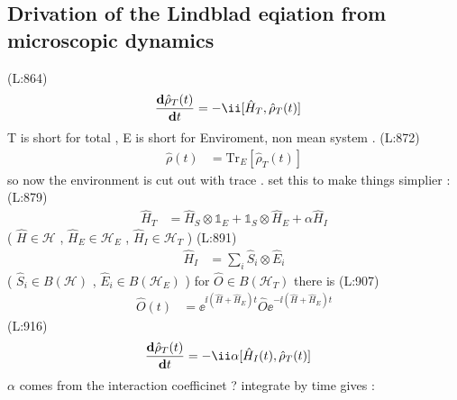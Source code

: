  \subsection{ Drivation of the Lindblad eqiation from microscopic dynamics}
(L:864)
\begin{equation}
\begin{split}
\dfrac{\bold{d}\hat{\rho }_{T }(t )}{\bold{d}t }&=-\ii [\hat{H }_{T },\hat{\rho }_{T }(t )]\end{split}
\end{equation}
 T is short for total , E is short for Enviroment, non mean system .
(L:872)
\begin{equation}
\begin{split}
\hat{\rho }(t )&=\text{Tr}_{E }[\hat{\rho }_{T }(t )]\end{split}
\end{equation}
 so now the environment is cut out with trace . 
 set this to make things simplier : 
(L:879)
\begin{equation}
\begin{split}
\hat{H }_{T }&=\hat{H }_{S }\otimes \mathds{1}_{E }+\mathds{1}_{S }\otimes \hat{H }_{E }+\alpha \hat{H }_{I }\end{split}
\end{equation}
 (
 $ \hat{H }\in \mathcal{H } $  , 
 $ \hat{H }_{E }\in \mathcal{H }_{E } $  , 
 $ \hat{H }_{I }\in \mathcal{H }_{T } $  
)
(L:891)
\begin{equation}
\begin{split}
\hat{H }_{I }&=\sum _{i }\hat{S }_{i }\otimes \hat{E }_{i }\end{split}
\end{equation}
 (
 $ \hat{S }_{i }\in B (\mathcal{H }) $  ,  
 $ \hat{E }_{i }\in B (\mathcal{H }_{E }) $ )
 for
 $ \hat{O }\in B (\mathcal{H }_{T }) $  there is 
(L:907)
\begin{equation}
\begin{split}
\hat{O }(t )&=\ee ^{\ii (\hat{H }+\hat{H }_{E })t }\hat{O }\ee ^{-\ii (\hat{H }+\hat{H }_{E })t }\end{split}
\end{equation}
(L:916)
\begin{equation}
\begin{split}
\dfrac{\bold{d}\hat{\rho }_{T }(t )}{\bold{d}t }&=-\ii \alpha [\hat{H }_{I }(t ),\hat{\rho }_{T }(t )]\end{split}
\end{equation}
 $ \alpha  $  comes from the interaction coefficinet ? 
 integrate by time gives : 
